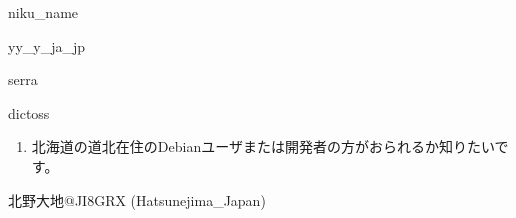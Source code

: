 \begin{prework}{ niku\_name}
\end{prework}

\begin{prework}{ yy\_y\_ja\_jp }
\end{prework}

\begin{prework}{ serra }
\end{prework}

\begin{prework}{ dictoss }
  \begin{enumerate}
  \item 北海道の道北在住のDebianユーザまたは開発者の方がおられるか知りたいです。
  \end{enumerate}
\end{prework}

\begin{prework}{ 北野大地@JI8GRX (Hatsunejima\_Japan) }
\end{prework}
